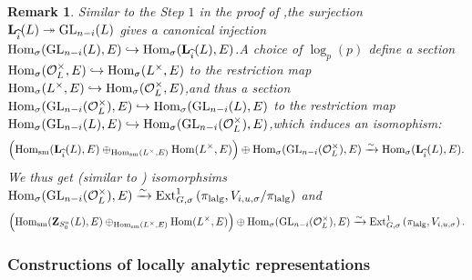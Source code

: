 \documentclass[10pt]{article}
\newtheorem{rmk}[thm]{Remark}
\newcommand{\homo}{{\rm Hom}}
\newcommand{\ext}{{\rm Ext}}
\newcommand{\GLN}{{\rm GL}}
\newcommand{\sm}{{\rm sm}}
\newcommand{\lalg}{{\rm lalg}}
\newcommand{\bL}{{\mathbf{L}}}
\newcommand{\bZ}{{\mathbf{Z}}}
\newcommand{\cO}{\mathcal O}
\begin{document}
\begin{rmk}\label{rmkforextgroupsigma}Similar to the Step $1$ in the proof of \cite[Proposition 2.2.4]{BDcritical25},\;the surjection $\bL_{\widehat{i}}(L)\twoheadrightarrow \GLN_{n-i}(L)$ gives a canonical injection $\homo_{\sigma}(\GLN_{n-i}(L),E)\hookrightarrow \homo_{\sigma}(\bL_{\widehat{i}}(L),E)$.\;A choice of $\log_p(p)$ define a section $\homo_{\sigma}(\cO_L^{\times},E)\hookrightarrow \homo_{\sigma}(L^{\times},E)$ to the restriction map $\homo_{\sigma}(L^{\times},E)\hookrightarrow \homo_{\sigma}(\cO_L^{\times},E)$,\;and thus a section $\homo_{\sigma}(\GLN_{n-i}(\cO_L^{\times}),E)\hookrightarrow \homo_{\sigma}(\GLN_{n-i}(L),E)$ to the restriction map $\homo_{\sigma}(\GLN_{n-i}(L),E)\hookrightarrow \homo_{\sigma}(\GLN_{n-i}(\cO_L^{\times}),E)$,\;which induces an isomophism:
	\begin{equation*}
		\begin{aligned}
			\Big(\homo_{\sm}(\bL_{\widehat{i}}(L),E)\oplus_{\homo_{\sm}(L^{\times},E)}\homo(L^{\times},E)\Big)\oplus \homo_{\sigma}(\GLN_{n-i}(\cO_L^{\times}),E)\xrightarrow{\sim} \homo_{\sigma}(\bL_{\widehat{i}}(L),E).
		\end{aligned}
	\end{equation*}
	We thus get (similar to \cite[(59)]{BDcritical25}) isomorphsims $\homo_{\sigma}(\GLN_{n-i}(\cO_L^{\times}),E)\xrightarrow{\sim}\ext^1_{G,\sigma}\left(\pi_{\lalg},V_{i,u,\sigma}/\pi_{\lalg}\right)$ and 
	\begin{equation*}
		\begin{aligned}
			\Big(\homo_{\sm}(\bZ_{S^u_0}(L),E)\oplus_{\homo_{\sm}(L^{\times},E)}\homo(L^{\times},E)\Big)\oplus \homo_{\sigma}(\GLN_{n-i}(\cO_L^{\times}),E)\xrightarrow{\sim} \ext^1_{G,\sigma}\left(\pi_{\lalg},V_{i,u,\sigma}\right).
		\end{aligned}
	\end{equation*}
\end{rmk}




\subsubsection{Constructions of locally analytic representations}
\end{document}
